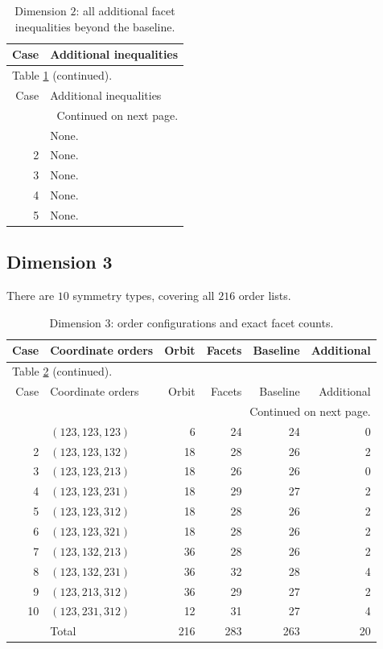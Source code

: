 \documentclass[a4paper,11pt]{amsart}
\numberwithin{equation}{section}
\theoremstyle{definition}
\theoremstyle{remark}
\begin{document}
{\small\setlength{\tabcolsep}{4.5pt}
\begin{longtable}{@{}r>{\raggedright\arraybackslash}p{12.9cm}@{}}
\caption{Dimension $ 2$: all additional facet inequalities beyond the baseline.}\label{tab:extras-n2}\\
\toprule
Case & Additional inequalities\\
\midrule\endfirsthead
\multicolumn{2}{l}{\small Table \ref{tab:extras-n2} (continued).}\\
\toprule
Case & Additional inequalities\\
\midrule\endhead
\midrule
\multicolumn{2}{r}{\small Continued on next page.}\\
\endfoot\bottomrule\endlastfoot
1 & None.\\[3pt]
2 & None.\\[3pt]
3 & None.\\[3pt]
4 & None.\\[3pt]
5 & None.\\[3pt]
\end{longtable}
}

\clearpage
\subsection{Dimension 3}\label{app:tables-n3}
There are $ 10$ symmetry types, covering all $ 216$ order lists.
{\small\setlength{\tabcolsep}{4.5pt}
\begin{longtable}{@{}rlrrrr@{}}
\caption{Dimension $ 3$: order configurations and exact facet counts.}\label{tab:counts-n3}\\
\toprule
Case & Coordinate orders & Orbit & Facets & Baseline & Additional\\
\midrule\endfirsthead
\multicolumn{6}{l}{\small Table \ref{tab:counts-n3} (continued).}\\
\toprule
Case & Coordinate orders & Orbit & Facets & Baseline & Additional\\
\midrule\endhead
\midrule
\multicolumn{6}{r}{\small Continued on next page.}\\
\endfoot\bottomrule\endlastfoot
1 & $(123,123,123)$ & 6 & 24 & 24 & 0\\
2 & $(123,123,132)$ & 18 & 28 & 26 & 2\\
3 & $(123,123,213)$ & 18 & 26 & 26 & 0\\
4 & $(123,123,231)$ & 18 & 29 & 27 & 2\\
5 & $(123,123,312)$ & 18 & 28 & 26 & 2\\
6 & $(123,123,321)$ & 18 & 28 & 26 & 2\\
7 & $(123,132,213)$ & 36 & 28 & 26 & 2\\
8 & $(123,132,231)$ & 36 & 32 & 28 & 4\\
9 & $(123,213,312)$ & 36 & 29 & 27 & 2\\
10 & $(123,231,312)$ & 12 & 31 & 27 & 4\\
\midrule
 & Total & 216 & 283 & 263 & 20\\
\end{longtable}
}
\end{document}
